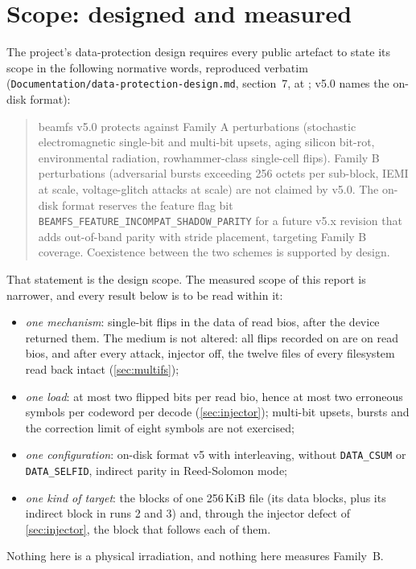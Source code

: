 \section{Scope: designed and measured}\label{sec:scope}

The project's data-protection design requires every public artefact to
state its scope in the following normative words, reproduced verbatim
(\texttt{Documentation/data-protection-design.md}, section~7, at
\texttt{\commitBeamfs}; v5.0 names the on-disk format):

\begin{quote}\small
beamfs v5.0 protects against Family A perturbations (stochastic
electromagnetic single-bit and multi-bit upsets, aging silicon bit-rot,
environmental radiation, rowhammer-class single-cell flips). Family B
perturbations (adversarial bursts exceeding 256 octets per sub-block,
IEMI at scale, voltage-glitch attacks at scale) are not claimed by v5.0.
The on-disk format reserves the feature flag bit
\nolinkurl{BEAMFS_FEATURE_INCOMPAT_SHADOW_PARITY} for a future v5.x
revision that adds out-of-band parity with stride placement, targeting
Family B coverage. Coexistence between the two schemes is supported by
design.
\end{quote}

That statement is the design scope. The measured scope of this report is
narrower, and every result below is to be read within it:
\begin{itemize}
\item \emph{one mechanism}: single-bit flips in the data of read bios,
  after the device returned them. The medium is not altered: all
  \flipsAnalysed{} flips recorded on \bfs are on read bios, and after
  every attack, injector off, the twelve files of every filesystem read
  back intact (\cref{sec:multifs});
\item \emph{one load}: at most two flipped bits per read bio, hence at
  most two erroneous symbols per codeword per decode
  (\cref{sec:injector}); multi-bit upsets, bursts and the correction
  limit of eight symbols are not exercised;
\item \emph{one configuration}: on-disk format v5 with interleaving,
  without \texttt{DATA\_CSUM} or \texttt{DATA\_SELFID}, indirect parity
  in Reed-Solomon mode;
\item \emph{one kind of target}: the blocks of one 256\,KiB file
  (its data blocks, plus its indirect block in runs 2 and 3) and,
  through the injector defect of \cref{sec:injector}, the block that
  follows each of them.
\end{itemize}
Nothing here is a physical irradiation, and nothing here measures
Family~B.
